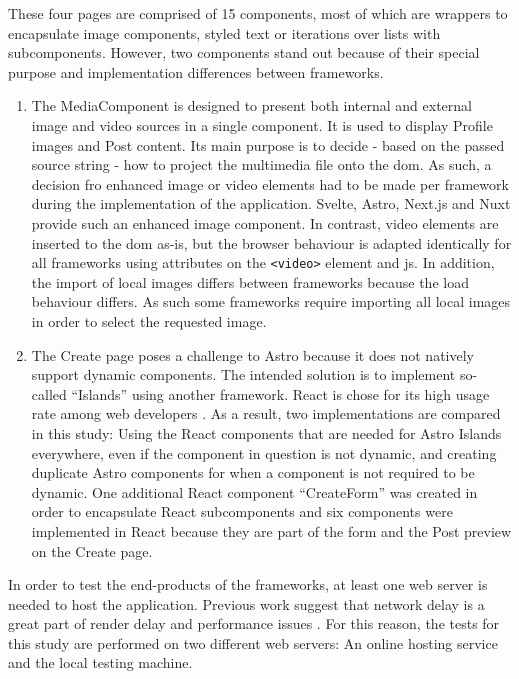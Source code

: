 \documentclass[a4paper, 12pt]{article}
\begin{document}
These four pages are comprised of 15 components, most of which are wrappers to encapsulate image components, styled text or iterations over lists with subcomponents.
However, two components stand out because of their special purpose and implementation differences between frameworks.

\begin{enumerate}
  \item The MediaComponent is designed to present both internal and external image and video sources in a single component.
  It is used to display Profile images and Post content.
  Its main purpose is to decide - based on the passed source string - how to project the multimedia file onto the \acrshort{dom}.
  As such, a decision fro enhanced image or video elements had to be made per framework during the implementation of the application.
  Svelte, Astro, Next.js and Nuxt provide such an enhanced image component.
  In contrast, video elements are inserted to the \acrshort{dom} as-is, but the browser behaviour is adapted identically for all frameworks using attributes on the \verb|<video>| element and \acrlong{js}.
  In addition, the import of local images differs between frameworks because the load behaviour differs.
  As such some frameworks require importing all local images in order to select the requested image.
  \item The Create page poses a challenge to Astro because it does not natively support dynamic components.
  The intended solution is to implement so-called \enquote{Islands} using another framework.
  React is chose for its high usage rate among web developers \citep{stateOfJs2023}.
  As a result, two implementations are compared in this study: Using the React components that are needed for Astro Islands everywhere, even if the component in question is not dynamic, and creating duplicate Astro components for when a component is not required to be dynamic.
  One additional React component \enquote{CreateForm} was created in order to encapsulate React subcomponents and six components were implemented in React because they are part of the form and the Post preview on the Create page.
\end{enumerate}

In order to test the end-products of the frameworks, at least one web server is needed to host the application.
Previous work suggest that network delay is a great part of render delay and performance issues \citep{highperformancebrowsernetworking}.
For this reason, the tests for this study are performed on two different web servers: An online hosting service and the local testing machine.
\end{document}
